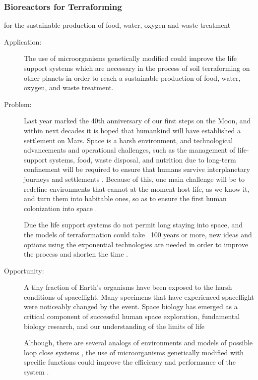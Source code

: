 \subsubsection{Bioreactors for Terraforming}
for  the sustainable production of  food, water, oxygen and waste treatment
 
\begin{description}   \item[Application:] The use of microorganisms genetically modified  could
improve the life support systems   which are necessary in the process of
soil   terraforming on other planets in order to reach a sustainable
production  of food, water, oxygen,  and waste treatment.
 
\item[Problem:]  Last year marked  the 40th anniversary of our first steps on
the  Moon, and within next decades  it is hoped that humankind will have
established   a settlement on Mars. Space is a harsh environment, and
technological  advancements and  operational challenges, such as the
management   of life-support systems, food, waste disposal, and
nutrition  due to long-term  confinement will be required to ensure that
humans  survive interplanetary  journeys and settlements \cite{Horneck2010}. Because of   this, one main challenge will be to redefine environments that cannot at the   moment host life, as we know it, and turn them into habitable ones, so   as to ensure the first human
colonization   into space   \cite{gerlach}.
 
Due  the life support systems do  not permit long staying into space,
and  the  models of terraformation could take ~100 years or more, new
ideas  and options using the  exponential technologies are needed in
order   to improve the process and shorten the time \cite{Heppener2008}.
 
\item[Opportunity:]  A tiny  fraction of Earth’s organisms have been exposed to
the  harsh conditions of  spaceflight. Many specimens that have
experienced   spaceflight were noticeably changed by the event. Space
biology  has emerged as a critical  component of successful human space
exploration,   fundamental biology research, and our understanding of
the  limits of life \cite{Dubertret1987,Hendrickx2007}
 
Although,  there are several  analogs of environments and models of
possible   loop close systems \cite{Poughon2009}, the use of
microorganisms  genetically  modified with specific functions could
improve   the efficiency and performance of the system \cite{Kern2001}.
 

\end{description}
